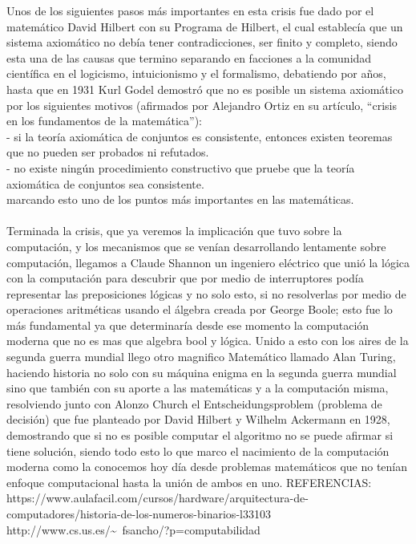 \documentclass{letter}
\begin{document}
Unos de los siguientes pasos más importantes en esta crisis fue dado por el matemático David Hilbert con su Programa de Hilbert, el cual establecía que un sistema axiomático no debía tener contradicciones, ser finito y completo, siendo esta una de las causas que termino separando en facciones a la comunidad científica en el logicismo, intuicionismo y el formalismo, debatiendo por años, hasta que en 1931 Kurl Godel demostró que no es posible un sistema axiomático por los siguientes motivos  (afirmados por Alejandro Ortiz en su artículo, “crisis en los fundamentos de la matemática”):\\
- si la teoría axiomática de conjuntos es consistente, entonces existen teoremas que no pueden ser probados ni refutados.\\
- no existe ningún procedimiento constructivo que pruebe que la teoría axiomática de conjuntos sea consistente.\\
marcando esto uno de los puntos más importantes en las matemáticas.\\\\
Terminada la crisis, que ya veremos la implicación que tuvo sobre la computación, y los mecanismos que se venían desarrollando lentamente sobre computación, llegamos a Claude Shannon un ingeniero eléctrico que unió la lógica con la computación para descubrir que por medio de interruptores podía representar las preposiciones lógicas y no solo esto, si no resolverlas por medio de operaciones aritméticas usando el álgebra creada por George Boole; esto fue lo más fundamental ya que determinaría desde ese momento la computación moderna que no es mas que algebra bool y lógica. Unido a esto con los aires de la segunda guerra mundial llego otro magnifico Matemático llamado Alan Turing, haciendo historia no solo con su máquina enigma en la segunda guerra mundial sino que también con su aporte a las matemáticas  y a la computación misma, resolviendo  junto con Alonzo Church el Entscheidungsproblem (problema de decisión) que fue  planteado por David Hilbert y Wilhelm Ackermann en 1928, demostrando que si no es posible computar el algoritmo no se puede afirmar si tiene solución, siendo todo esto lo que marco el nacimiento de la computación moderna como la conocemos hoy día desde problemas matemáticos que no tenían enfoque computacional hasta la unión de ambos en uno.
\newpage
REFERENCIAS:\\
https://www.aulafacil.com/cursos/hardware/arquitectura-de-computadores/historia-de-los-numeros-binarios-l33103 \\
http://www.cs.us.es/\~~fsancho/?p=computabilidad \\
\end{document}
